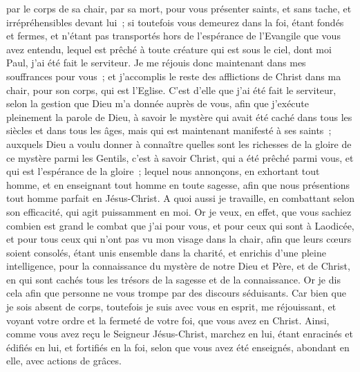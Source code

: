 \begin{multicols}{2}
par le corps de sa chair, par sa mort, pour vous présenter saints, et sans tache, et irrépréhensibles devant lui~;
si toutefois vous demeurez dans la foi, étant fondés et fermes, et n'étant pas transportés hors de l'espérance de l'Evangile que vous avez entendu, lequel est prêché à toute créature qui est sous le ciel, dont moi Paul, j'ai été fait le serviteur.
Je me réjouis donc maintenant dans mes souffrances pour vous~; et j'accomplis le reste des afflictions de Christ dans ma chair, pour son corps, qui est l'Eglise.
C'est d'elle que j'ai été fait le serviteur, selon la gestion que Dieu m'a donnée auprès de vous, afin que j'exécute pleinement la parole de Dieu,
à savoir le mystère qui avait été caché dans tous les siècles et dans tous les âges, mais qui est maintenant manifesté à ses saints~;
auxquels Dieu a voulu donner à connaître quelles sont les richesses de la gloire de ce mystère parmi les Gentils, c'est à savoir Christ, qui a été prêché parmi vous, et qui est l'espérance de la gloire~; 
lequel nous annonçons, en exhortant tout homme, et en enseignant tout homme en toute sagesse, afin que nous présentions tout homme parfait en Jésus-Christ.
A quoi aussi je travaille, en combattant selon son efficacité, qui agit puissamment en moi.
\VerseOne{}Or je veux, en effet, que vous sachiez combien est grand le combat que j'ai pour vous, et pour ceux qui sont à Laodicée, et pour tous ceux qui n'ont pas vu mon visage dans la chair,
afin que leurs cœurs soient consolés, étant unis ensemble dans la charité, et enrichis d'une pleine intelligence, pour la connaissance du mystère de notre Dieu et Père, et de Christ,
en qui sont cachés tous les trésors de la sagesse et de la connaissance.
Or je dis cela afin que personne ne vous trompe par des discours séduisants.
Car bien que je sois absent de corps, toutefois je suis avec vous en esprit, me réjouissant, et voyant votre ordre et la fermeté de votre foi, que vous avez en Christ.
Ainsi, comme vous avez reçu le Seigneur Jésus-Christ, marchez en lui,
étant enracinés et édifiés en lui, et fortifiés en la foi, selon que vous avez été enseignés, abondant en elle, avec actions de grâces.

\end{multicols}
